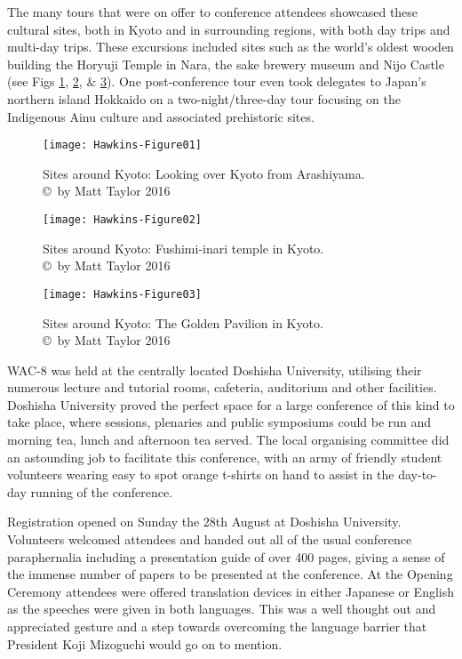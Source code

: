 The many tours that were on offer to conference attendees showcased these cultural sites, both in Kyoto and in surrounding regions, with both day trips and multi-day trips. These excursions included sites such as the world’s oldest wooden building the Horyuji Temple in Nara, the sake brewery museum and Nijo Castle (see Figs \ref{fig:Hawkins-Figure01}, \ref{fig:Hawkins-Figure02}, \& \ref{fig:Hawkins-Figure03}). One post-conference tour even took delegates to Japan’s northern island Hokkaido on a two-night/three-day tour focusing on the Indigenous Ainu culture and associated prehistoric sites.

\begin{figure}[!htb] %
	\centering
	\texttt{[image: Hawkins-Figure01]}
	\caption{Sites around Kyoto: Looking over Kyoto from Arashiyama.  
		{\normalfont\scriptsize \\ \copyright\ by Matt Taylor 2016}}
	\label{fig:Hawkins-Figure01}
\end{figure}

\begin{figure}[!htb] %
	\centering
	\texttt{[image: Hawkins-Figure02]}
	\caption{Sites around Kyoto: Fushimi-inari temple in Kyoto. 
		{\normalfont\scriptsize \\ \copyright\ by Matt Taylor 2016}}
	\label{fig:Hawkins-Figure02}
\end{figure}

\begin{figure}[!htb] %
	\centering
	\texttt{[image: Hawkins-Figure03]}
	\caption{Sites around Kyoto: The Golden Pavilion in Kyoto. 
		{\normalfont\scriptsize \\ \copyright\ by Matt Taylor 2016}}
	\label{fig:Hawkins-Figure03}
\end{figure}
  
WAC-8 was held at the centrally located Doshisha University, utilising their numerous lecture and tutorial rooms, cafeteria, auditorium and other facilities. Doshisha University proved the perfect space for a large conference of this kind to take place, where sessions, plenaries and public symposiums could be run and morning tea, lunch and afternoon tea served. The local organising committee did an astounding job to facilitate this conference, with an army of friendly student volunteers wearing easy to spot orange t-shirts on hand to assist in the day-to-day running of the conference. 

Registration opened on Sunday the 28th August at Doshisha University. Volunteers welcomed attendees and handed out all of the usual conference paraphernalia including a presentation guide of over \num{400} pages, giving a sense of the immense number of papers to be presented at the conference. At the Opening Ceremony attendees were offered translation devices in either Japanese or English as the speeches were given in both languages. This was a well thought out and appreciated gesture and a step towards overcoming the language barrier that President Koji Mizoguchi would go on to mention. 

